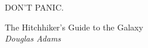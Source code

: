 \documentclass[tcc]{subfile}
\begin{document}
\begin{epigrafe}
    \vspace*{\fill}
	\begin{flushright}
        \epigraph{\centering\huge \textsf{DON'T PANIC.}}{The Hitchhiker's Guide to the Galaxy\\\emph{Douglas Adams}}
	\end{flushright}
\end{epigrafe}
\end{document}
